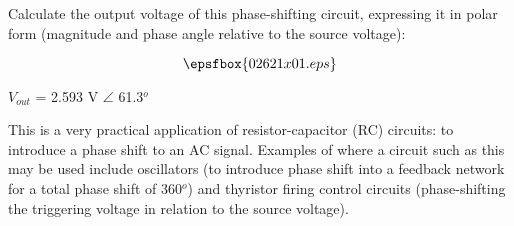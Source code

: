 

Calculate the output voltage of this phase-shifting circuit, expressing it in polar form (magnitude and phase angle relative to the source voltage):

$$\epsfbox{02621x01.eps}$$







$V_{out}$ = 2.593 V $\angle$ 61.3$^{o}$







This is a very practical application of resistor-capacitor (RC) circuits: to introduce a phase shift to an AC signal.  Examples of where a circuit such as this may be used include oscillators (to introduce phase shift into a feedback network for a total phase shift of 360$^{o}$) and thyristor firing control circuits (phase-shifting the triggering voltage in relation to the source voltage).




